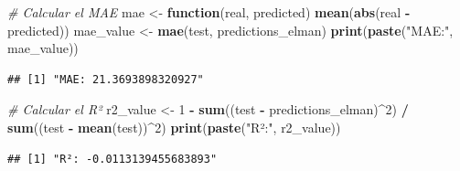 \documentclass[
]{book}
\newenvironment{Shaded}{\begin{snugshade}}{\end{snugshade}}
\newcommand{\CommentTok}[1]{\textcolor[rgb]{0.56,0.35,0.01}{\textit{#1}}}
\newcommand{\ControlFlowTok}[1]{\textcolor[rgb]{0.13,0.29,0.53}{\textbf{#1}}}
\newcommand{\DecValTok}[1]{\textcolor[rgb]{0.00,0.00,0.81}{#1}}
\newcommand{\FunctionTok}[1]{\textcolor[rgb]{0.13,0.29,0.53}{\textbf{#1}}}
\newcommand{\NormalTok}[1]{#1}
\newcommand{\OtherTok}[1]{\textcolor[rgb]{0.56,0.35,0.01}{#1}}
\newcommand{\SpecialCharTok}[1]{\textcolor[rgb]{0.81,0.36,0.00}{\textbf{#1}}}
\newcommand{\StringTok}[1]{\textcolor[rgb]{0.31,0.60,0.02}{#1}}
\begin{document}
\begin{Shaded}
\begin{Highlighting}[]
\CommentTok{\# Calcular el MAE}
\NormalTok{mae }\OtherTok{\textless{}{-}} \ControlFlowTok{function}\NormalTok{(real, predicted) }\FunctionTok{mean}\NormalTok{(}\FunctionTok{abs}\NormalTok{(real }\SpecialCharTok{{-}}\NormalTok{ predicted))}
\NormalTok{mae\_value }\OtherTok{\textless{}{-}} \FunctionTok{mae}\NormalTok{(test, predictions\_elman)}
\FunctionTok{print}\NormalTok{(}\FunctionTok{paste}\NormalTok{(}\StringTok{"MAE:"}\NormalTok{, mae\_value))}
\end{Highlighting}
\end{Shaded}

\begin{verbatim}
## [1] "MAE: 21.3693898320927"
\end{verbatim}

\begin{Shaded}
\begin{Highlighting}[]
\CommentTok{\# Calcular el R²}
\NormalTok{r2\_value }\OtherTok{\textless{}{-}} \DecValTok{1} \SpecialCharTok{{-}} \FunctionTok{sum}\NormalTok{((test }\SpecialCharTok{{-}}\NormalTok{ predictions\_elman)}\SpecialCharTok{\^{}}\DecValTok{2}\NormalTok{) }\SpecialCharTok{/} \FunctionTok{sum}\NormalTok{((test }\SpecialCharTok{{-}} \FunctionTok{mean}\NormalTok{(test))}\SpecialCharTok{\^{}}\DecValTok{2}\NormalTok{)}
\FunctionTok{print}\NormalTok{(}\FunctionTok{paste}\NormalTok{(}\StringTok{"R²:"}\NormalTok{, r2\_value))}
\end{Highlighting}
\end{Shaded}

\begin{verbatim}
## [1] "R²: -0.0113139455683893"
\end{verbatim}
\end{document}
